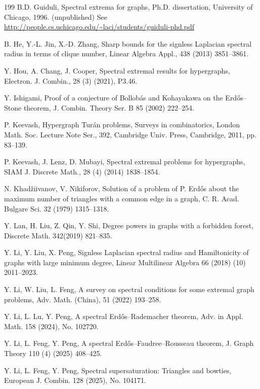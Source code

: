 \documentclass[11pt,a4paper]{article}
\theoremstyle{plain}
\theoremstyle{definition}
\begin{document}
\begin{thebibliography}{199}
B.D. Guiduli, 
 Spectral extrema for graphs, 
 Ph.D. dissertation, 
University of Chicago, 1996. (unpublished)
See \url{http://people.cs.uchicago.edu/~laci/students/guiduli-phd.pdf}  


B. He, Y.-L. Jin, X.-D. Zhang, Sharp bounds for the signless Laplacian spectral radius in terms of clique number,  
{Linear Algebra Appl.}, 438 (2013) 3851--3861.

Y. Hou, A. Chang, J. Cooper, Spectral extremal results for hypergraphs,  
{Electron. J. Combin.}, 28 (3) (2021), P3.46. 
 
Y. Ishigami, 
Proof of a conjecture of Bollob\'{a}s and Kohayakawa on 
the Erd\H{o}s--Stone theorem, 
J. Combin. Theory Ser. B 85 (2002) 222--254.

P. Keevash,  Hypergraph Tur\'{a}n problems, 
Surveys in combinatorics, London Math. Soc. Lecture Note Ser., 392, Cambridge Univ. Press, Cambridge, 2011, pp. 83--139.

 P. Keevash, J. Lenz, D. Mubayi, Spectral extremal problems for hypergraphs,  
{SIAM J. Discrete Math.}, 28 (4) (2014) 1838--1854.

N. Khad\v{z}iivanov, V. Nikiforov, 
Solution of a problem of {P. Erd\H{o}s} 
about the maximum number of
  triangles with a common edge in a graph, 
C. R. Acad. Bulgare Sci. 32 (1979) 1315--1318. 

 Y. Lan, H. Liu, Z. Qin, Y. Shi, Degree powers in graphs with a forbidden forest, Discrete Math. 342(2019) 821--835.


Y. Li, Y. Liu, X. Peng, 
Signless Laplacian spectral radius and Hamiltonicity of graphs with large minimum degree,  
Linear Multilinear Algebra 66 (2018) (10) 2011--2023. 
 

Y. Li, W. Liu, L. Feng, A survey on spectral conditions for some extremal graph problems,  
{Adv. Math. (China)}, 51 (2022) 193--258.

Y. Li, L. Lu, Y. Peng, 
A spectral Erd\H{o}s--Rademacher theorem, 
Adv. in Appl. Math. 158 (2024), No. 102720.


Y. Li, L. Feng, Y. Peng, 
A spectral Erd\H{o}s--Faudree--Rousseau theorem, 
J. Graph Theory 110 (4) (2025) 408--425.  


Y. Li, L. Feng, Y. Peng, 
Spectral supersaturation: Triangles and bowties, 
European J. Combin.  128 (2025), No. 104171. 


\end{thebibliography}
\end{document}

